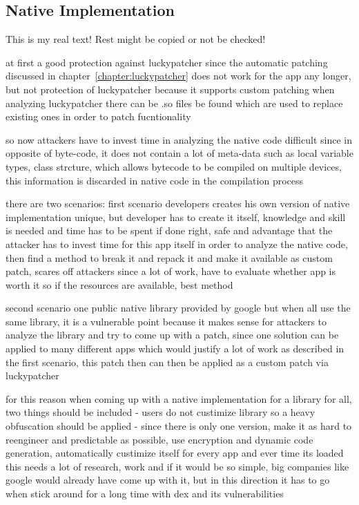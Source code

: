 \subsection{Native Implementation} \label{subsection:evaluation-modifications-dynamic}
This is my real text! Rest might be copied or not be checked!

at first a good protection against luckypatcher since the automatic patching discussed in chapter~\ref{chapter:luckypatcher} does not work for the app any longer, but not protection of luckypatcher because it supports custom patching
when analyzing luckypatcher there can be .so files be found which are used to replace existing ones in order to patch fucntionality

so now attackers have to invest time in analyzing the native code
difficult since in opposite of byte-code, it does not contain a lot of meta-data such as local variable types, class strcture, which allows bytecode to be compiled on multiple devices, this information is discarded in native code in the compilation process

there are two scenarios:
first scenario
developers creates his own version of native implementation
unique, but developer has to create it itself, knowledge and skill is needed and time has to be spent
if done right, safe and advantage that the attacker has to invest time for this app itself in order to analyze the native code, then find a method to break it and repack it and make it available as custom patch, scares off attackers since a lot of work, have to evaluate whether app is worth it
so if the resources are available, best method

second scenario
one public native library provided by google
but when all use the same library, it is a vulnerable point because it makes sense for attackers to analyze the library and try to come up with a patch, since one solution can be applied to many different apps which would justify a lot of work as described in the first scenario, this patch then can then be applied as a custom patch via luckypatcher

for this reason when coming up with a native implementation for a library for all, two things should be included
- users do not custimize library so a heavy obfuscation should be applied
- since there is only one version, make it as hard to reengineer and predictable as possible, use encryption and dynamic code generation, automatically custimize itself for every app and ever time its loaded
this needs a lot of research, work and if it would be so simple, big companies like google would already have come up with it, but in this direction it has to go when stick around for a long time with dex and its vulnerabilities
